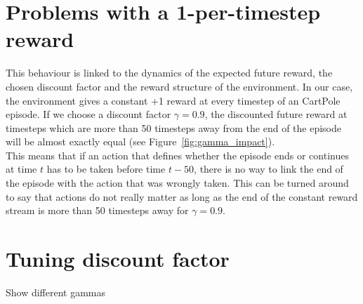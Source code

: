 \section{Problems with a 1-per-timestep reward}
This behaviour is linked to the dynamics of the expected future reward, 
the chosen discount factor and the reward structure of the environment.
In our case, the environment gives a constant +1 reward at every timestep of
an CartPole episode. If we choose a discount factor $\gamma=0.9$, the
discounted future reward at timesteps which are more than 50 timesteps away
from the end of the episode will be almost exactly equal (see 
Figure~\ref{fig:gamma_impact}).\\

This means that if an action that defines whether the episode ends or continues
at time $t$ has to be taken before time $t-50$, there is no way to link the
end of the episode with the action that was wrongly taken. This can be turned
around to say that actions do not really matter as long as the end of the
constant reward stream is more than 50 timesteps away for $\gamma=0.9$. 



\section{Tuning discount factor}
Show different gammas

